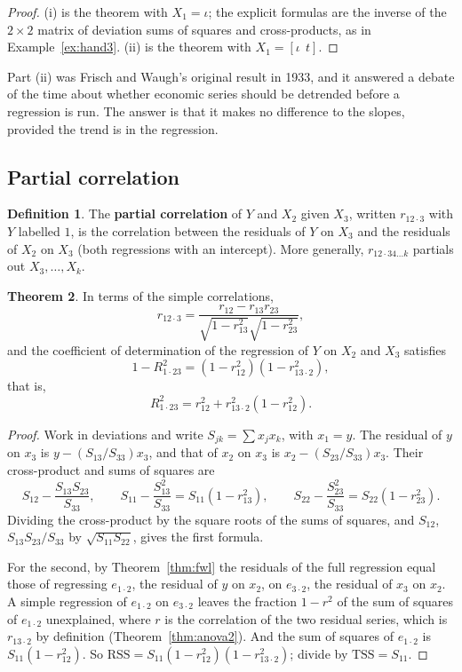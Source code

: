 \documentclass[11pt,a4paper]{article}
\numberwithin{equation}{section}
\theoremstyle{definition}
\newtheorem{thm}{Theorem}[subsection]
\newtheorem{defn}[thm]{Definition}
\begin{document}
\begin{proof}
(i) is the theorem with $X_1 = \iota$; the explicit formulas are the inverse of the $2 \times 2$ matrix of deviation sums of squares and cross-products,
as in Example~\ref{ex:hand3}. (ii) is the theorem with $X_1 = [\iota\ \ t]$.
\end{proof}

Part (ii) was Frisch and Waugh's original result in 1933, and it answered a debate of the time about whether economic series should be detrended
before a regression is run. The answer is that it makes no difference to the slopes, provided the trend is in the regression.

\subsection{Partial correlation}
\label{ssec:partial}

\begin{defn}
The \textbf{partial correlation} of $Y$ and $X_2$ given $X_3$, written $r_{12\cdot3}$ with $Y$ labelled $1$, is the correlation between the residuals of
$Y$ on $X_3$ and the residuals of $X_2$ on $X_3$ (both regressions with an intercept). More generally, $r_{12\cdot34\ldots k}$ partials out $X_3, \dots, X_k$.
\end{defn}

\begin{thm}
\label{thm:partial}
In terms of the simple correlations,
\[
r_{12\cdot3} = \frac{r_{12} - r_{13}r_{23}}{\sqrt{1 - r_{13}^2}\sqrt{1 - r_{23}^2}} ,
\]
and the coefficient of determination of the regression of $Y$ on $X_2$ and $X_3$ satisfies
\[
1 - R^2_{1\cdot23} = (1 - r_{12}^2)(1 - r_{13\cdot2}^2),
\]
that is,
\[
R^2_{1\cdot23} = r_{12}^2 + r_{13\cdot2}^2(1 - r_{12}^2) .
\]
\end{thm}

\begin{proof}
Work in deviations and write $S_{jk} = \sum x_jx_k$, with $x_1 = y$. The residual of $y$ on $x_3$ is $y - (S_{13}/S_{33})x_3$, and that of $x_2$ on $x_3$ is
$x_2 - (S_{23}/S_{33})x_3$. Their cross-product and sums of squares are
\[
S_{12} - \frac{S_{13}S_{23}}{S_{33}}, \qquad S_{11} - \frac{S_{13}^2}{S_{33}} = S_{11}(1 - r_{13}^2), \qquad S_{22} - \frac{S_{23}^2}{S_{33}} = S_{22}(1 - r_{23}^2) .
\]
Dividing the cross-product by the square roots of the sums of squares, and $S_{12}$, $S_{13}S_{23}/S_{33}$ by $\sqrt{S_{11}S_{22}}$, gives the first formula.

For the second, by Theorem~\ref{thm:fwl} the residuals of the full regression equal those of regressing $e_{1\cdot2}$, the residual of $y$ on $x_2$, on
$e_{3\cdot2}$, the residual of $x_3$ on $x_2$. A simple regression of $e_{1\cdot2}$ on $e_{3\cdot2}$ leaves the fraction $1 - r^2$ of the sum of squares of
$e_{1\cdot2}$ unexplained, where $r$ is the correlation of the two residual series, which is $r_{13\cdot2}$ by definition (Theorem~\ref{thm:anova2}). And the sum
of squares of $e_{1\cdot2}$ is $S_{11}(1 - r_{12}^2)$. So $\text{RSS} = S_{11}(1 - r_{12}^2)(1 - r_{13\cdot2}^2)$; divide by $\text{TSS} = S_{11}$.
\end{proof}
\end{document}
